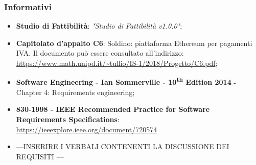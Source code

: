 \subsubsection{Informativi}
\begin{itemize}
	\item \textbf{Studio di Fattibilità}: \textit{"Studio di Fattibilità v1.0.0"};
	\item \textbf{Capitolato d'appalto C6}: Soldino: piattaforma Ethereum per pagamenti IVA. Il documento può essere consultato all'indirizzo: \textsf{\url{ https://www.math.unipd.it/~tullio/IS-1/2018/Progetto/C6.pdf}};
	\item \textbf{Software Engineering - Ian Sommerville - 10\textsuperscript{th} Edition 2014}
	\subitem - Chapter 4: Requirements engineering;
	\item \textbf{830-1998 - IEEE Recommended Practice for Software Requirements Specifications}: \textsf{\url{https://ieeexplore.ieee.org/document/720574}}
	\item ---INSERIRE I VERBALI CONTENENTI LA DISCUSSIONE DEI REQUISITI ---
	
\end{itemize}